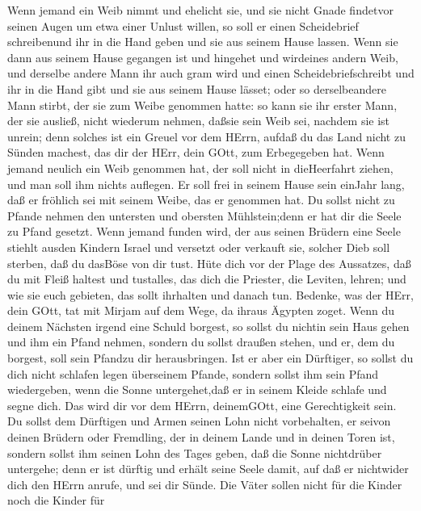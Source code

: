  Wenn jemand ein Weib nimmt und ehelicht sie, und sie nicht
Gnade findetvor seinen Augen um etwa einer Unlust willen, so soll er
einen Scheidebrief schreibenund ihr in die Hand geben und sie aus seinem
Hause lassen.  Wenn sie dann aus seinem Hause gegangen ist
und hingehet und wirdeines andern Weib,  und derselbe andere
Mann ihr auch gram wird und einen Scheidebriefschreibt und ihr in die
Hand gibt und sie aus seinem Hause lässet; oder so derselbeandere Mann
stirbt, der sie zum Weibe genommen hatte:  so kann sie ihr
erster Mann, der sie ausließ, nicht wiederum nehmen, daßsie sein Weib
sei, nachdem sie ist unrein; denn solches ist ein Greuel vor dem HErrn,
aufdaß du das Land nicht zu Sünden machest, das dir der HErr, dein GOtt,
zum Erbegegeben hat.  Wenn jemand neulich ein Weib genommen
hat, der soll nicht in dieHeerfahrt ziehen, und man soll ihm nichts
auflegen. Er soll frei in seinem Hause sein einJahr lang, daß er
fröhlich sei mit seinem Weibe, das er genommen hat.  Du
sollst nicht zu Pfande nehmen den untersten und obersten Mühlstein;denn
er hat dir die Seele zu Pfand gesetzt.  Wenn jemand funden
wird, der aus seinen Brüdern eine Seele stiehlt ausden Kindern Israel
und versetzt oder verkauft sie, solcher Dieb soll sterben, daß du
dasBöse von dir tust.  Hüte dich vor der Plage des
Aussatzes, daß du mit Fleiß haltest und tustalles, das dich die
Priester, die Leviten, lehren; und wie sie euch gebieten, das sollt
ihrhalten und danach tun.  Bedenke, was der HErr, dein GOtt,
tat mit Mirjam auf dem Wege, da ihraus Ägypten zoget.  Wenn
du deinem Nächsten irgend eine Schuld borgest, so sollst du nichtin sein
Haus gehen und ihm ein Pfand nehmen,  sondern du sollst
draußen stehen, und er, dem du borgest, soll sein Pfandzu dir
herausbringen.  Ist er aber ein Dürftiger, so sollst du
dich nicht schlafen legen überseinem Pfande,  sondern
sollst ihm sein Pfand wiedergeben, wenn die Sonne untergehet,daß er in
seinem Kleide schlafe und segne dich. Das wird dir vor dem HErrn,
deinemGOtt, eine Gerechtigkeit sein.  Du sollst dem
Dürftigen und Armen seinen Lohn nicht vorbehalten, er seivon deinen
Brüdern oder Fremdling, der in deinem Lande und in deinen Toren ist,
 sondern sollst ihm seinen Lohn des Tages geben, daß die
Sonne nichtdrüber untergehe; denn er ist dürftig und erhält seine Seele
damit, auf daß er nichtwider dich den HErrn anrufe, und sei dir Sünde.
 Die Väter sollen nicht für die Kinder noch die Kinder für
